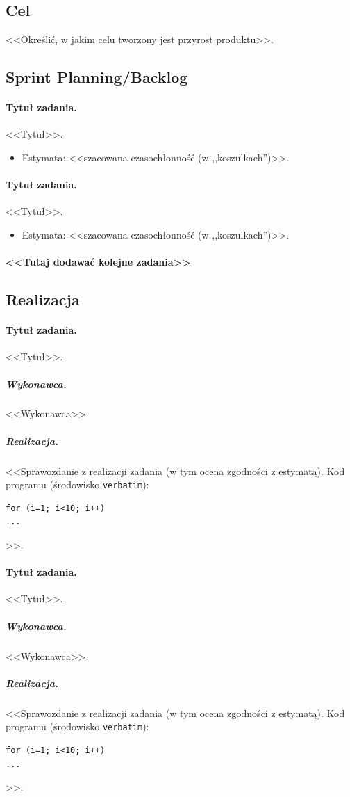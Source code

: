 \documentclass[a4paper]{article}
\begin{document}
\subsection{Cel} <<Określić, w jakim celu tworzony jest przyrost produktu>>.

\subsection{Sprint Planning/Backlog}

\paragraph{Tytuł zadania.} <<Tytuł>>.
\begin{itemize}
\item Estymata: <<szacowana czasochłonność (w ,,koszulkach'')>>.
\end{itemize}

\paragraph{Tytuł zadania.} <<Tytuł>>.
\begin{itemize}
\item Estymata: <<szacowana czasochłonność (w ,,koszulkach'')>>.
\end{itemize}

\paragraph{<<Tutaj dodawać kolejne zadania>>}

\subsection{Realizacja}

\paragraph{Tytuł zadania.} <<Tytuł>>.
\subparagraph{Wykonawca.} <<Wykonawca>>.
\subparagraph{Realizacja.} <<Sprawozdanie z realizacji zadania (w tym ocena zgodności z estymatą). Kod programu (środowisko \texttt{verbatim}): \begin{verbatim}
for (i=1; i<10; i++)
...
\end{verbatim}>>.

\paragraph{Tytuł zadania.} <<Tytuł>>.
\subparagraph{Wykonawca.} <<Wykonawca>>.
\subparagraph{Realizacja.} <<Sprawozdanie z realizacji zadania (w tym ocena zgodności z estymatą). Kod programu (środowisko \texttt{verbatim}): \begin{verbatim}
for (i=1; i<10; i++)
...
\end{verbatim}>>.
\end{document}
